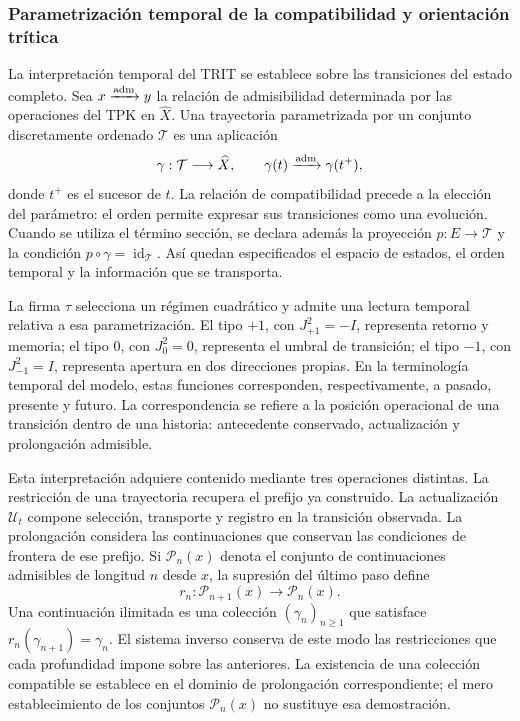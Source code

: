 \subsubsection{Parametrización temporal de la compatibilidad y orientación trítica}
\label{trit-temporal-compatibilidad}

La interpretación temporal del TRIT se establece sobre las transiciones del
estado completo. Sea \(x\xrightarrow{\rm adm}y\) la relación de admisibilidad determinada
por las operaciones del TPK en \(\widehat X\). Una trayectoria parametrizada
por un conjunto discretamente ordenado \(\mathcal T\) es una aplicación
\[
 \gamma:\mathcal T\longrightarrow\widehat X,\qquad
 \gamma(t)\xrightarrow{\rm adm}\gamma(t^+),
\]
donde \(t^+\) es el sucesor de \(t\). La relación de compatibilidad precede a
la elección del parámetro: el orden permite expresar sus transiciones como
una evolución. Cuando se utiliza el término sección, se declara además la
proyección \(p:E\to\mathcal T\) y la condición
\(p\circ\gamma=\operatorname{id}_{\mathcal T}\). Así quedan especificados
el espacio de estados, el orden temporal y la información que se transporta.

La firma \(\tau\) selecciona un régimen cuadrático y admite una lectura
temporal relativa a esa parametrización. El tipo \(+1\), con
\(J_{+1}^{2}=-I\), representa retorno y memoria; el tipo \(0\), con
\(J_0^{2}=0\), representa el umbral de transición; el tipo \(-1\), con
\(J_{-1}^{2}=I\), representa apertura en dos direcciones propias. En la
terminología temporal del modelo, estas funciones corresponden,
respectivamente, a pasado, presente y futuro. La correspondencia se refiere
a la posición operacional de una transición dentro de una historia:
antecedente conservado, actualización y prolongación admisible.

Esta interpretación adquiere contenido mediante tres operaciones distintas.
La restricción de una trayectoria recupera el prefijo ya construido. La
actualización \(\mathcal U_t\) compone selección, transporte y registro en
la transición observada. La prolongación considera las continuaciones que
conservan las condiciones de frontera de ese prefijo. Si
\(\mathcal P_n(x)\) denota el conjunto de continuaciones admisibles de
longitud \(n\) desde \(x\), la supresión del último paso define
\[
 r_n:\mathcal P_{n+1}(x)\longrightarrow\mathcal P_n(x).
\]
Una continuación ilimitada es una colección \((\gamma_n)_{n\geq1}\) que
satisface \(r_n(\gamma_{n+1})=\gamma_n\). El sistema inverso conserva de
este modo las restricciones que cada profundidad impone sobre las
anteriores. La existencia de una colección compatible se establece en el
dominio de prolongación correspondiente; el mero establecimiento de los
conjuntos \(\mathcal P_n(x)\) no sustituye esa demostración.


